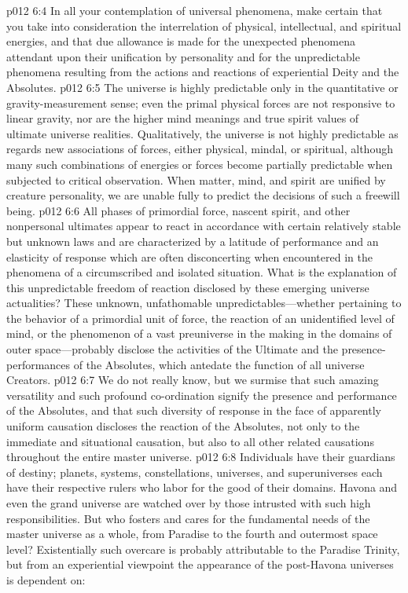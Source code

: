 \vs p012 6:4 In all your contemplation of universal phenomena, make certain that you take into consideration the interrelation of physical, intellectual, and spiritual energies, and that due allowance is made for the unexpected phenomena attendant upon their unification by personality and for the unpredictable phenomena resulting from the actions and reactions of experiential Deity and the Absolutes.
\vs p012 6:5 The universe is highly predictable only in the quantitative or gravity\hyp{}measurement sense; even the primal physical forces are not responsive to linear gravity, nor are the higher mind meanings and true spirit values of ultimate universe realities. Qualitatively, the universe is not highly predictable as regards new associations of forces, either physical, mindal, or spiritual, although many such combinations of energies or forces become partially predictable when subjected to critical observation. When matter, mind, and spirit are unified by creature personality, we are unable fully to predict the decisions of such a freewill being.
\pc \vs p012 6:6 All phases of primordial force, nascent spirit, and other nonpersonal ultimates appear to react in accordance with certain relatively stable but unknown laws and are characterized by a latitude of performance and an elasticity of response which are often disconcerting when encountered in the phenomena of a circumscribed and isolated situation. What is the explanation of this unpredictable freedom of reaction disclosed by these emerging universe actualities? These unknown, unfathomable unpredictables---whether pertaining to the behavior of a primordial unit of force, the reaction of an unidentified level of mind, or the phenomenon of a vast preuniverse in the making in the domains of outer space---probably disclose the activities of the Ultimate and the presence\hyp{}performances of the Absolutes, which antedate the function of all universe Creators.
\vs p012 6:7 We do not really know, but we surmise that such amazing versatility and such profound co\hyp{}ordination signify the presence and performance of the Absolutes, and that such diversity of response in the face of apparently uniform causation discloses the reaction of the Absolutes, not only to the immediate and situational causation, but also to all other related causations throughout the entire master universe.
\pc \vs p012 6:8 Individuals have their guardians of destiny; planets, systems, constellations, universes, and superuniverses each have their respective rulers who labor for the good of their domains. Havona and even the grand universe are watched over by those intrusted with such high responsibilities. But who fosters and cares for the fundamental needs of the master universe as a whole, from Paradise to the fourth and outermost space level? Existentially such overcare is probably attributable to the Paradise Trinity, but from an experiential viewpoint the appearance of the post\hyp{}Havona universes is dependent on:
